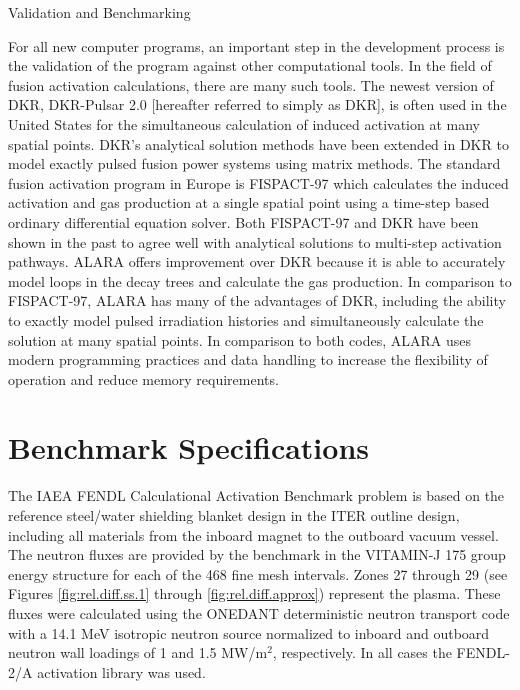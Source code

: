 \begin{chapter}{Validation and Benchmarking}

\begin{figure*}[htbp]
  \begin{center}
    \caption{Relative difference between ALARA and other codes for
      steady state problem at a cooling time of 1 hour.}
    \label{fig:rel.diff.ss.1}
  \end{center}
\end{figure*}

For all new computer programs, an important step in the development
process is the validation of the program against other computational
tools.  In the field of fusion activation calculations, there are many
such tools.  The newest version of DKR\cite{bib:DKR}, DKR-Pulsar
2.0\cite{bib:DKRP} [hereafter referred to simply as DKR], is often
used in the United States for the simultaneous calculation of induced
activation at many spatial points.  DKR's analytical solution methods
have been extended in DKR to model exactly pulsed fusion power systems
using matrix methods\cite{bib:spangler}.  The standard fusion
activation program in Europe is FISPACT-97 which calculates the
induced activation and gas production at a single spatial point using
a time-step based ordinary differential equation solver.  Both
FISPACT-97 and DKR have been shown in the past to agree well with
analytical solutions to multi-step activation
pathways\cite{bib:IAEA.bench2.rep}.  ALARA offers improvement over DKR
because it is able to accurately model loops in the decay trees and
calculate the gas production.  In comparison to FISPACT-97, ALARA has
many of the advantages of DKR, including the ability to exactly model
pulsed irradiation histories and simultaneously calculate the solution
at many spatial points.  In comparison to both codes, ALARA uses
modern programming practices and data handling to increase the
flexibility of operation and reduce memory requirements.

\section{Benchmark Specifications}

The IAEA FENDL Calculational Activation
Benchmark\cite{bib:IAEA.bench1.spec} problem is based on the reference
steel/water shielding blanket design in the ITER outline design,
including all materials from the inboard magnet to the outboard vacuum
vessel.  The neutron fluxes are provided by the benchmark in the
VITAMIN-J 175 group energy structure for each of the 468 fine mesh
intervals.  Zones 27 through 29 (see Figures \ref{fig:rel.diff.ss.1}
through \ref{fig:rel.diff.approx}) represent the plasma.  These fluxes
were calculated using the ONEDANT\cite{bib:ONEDANT} deterministic
neutron transport code with a 14.1 MeV isotropic neutron source
normalized to inboard and outboard neutron wall loadings of 1 and 1.5
MW/m$^2$, respectively.  In all cases the FENDL-2/A activation library
was used.


\end{chapter}
